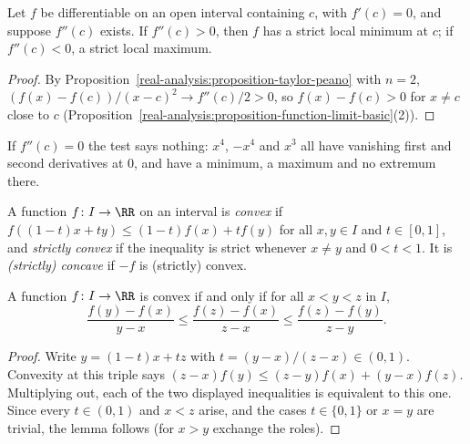\begin{corollary}\label{real-analysis:corollary-second-derivative-test}
Let $f$ be differentiable on an open interval containing $c$, with $f'(c) = 0$, and suppose $f''(c)$ exists. If $f''(c) > 0$, then $f$ has a strict local minimum at $c$; if $f''(c) < 0$, a strict local maximum.
\end{corollary}

\begin{proof}
By Proposition~\ref{real-analysis:proposition-taylor-peano} with $n = 2$, $(f(x) - f(c))/(x - c)^2 \to f''(c)/2 > 0$, so $f(x) - f(c) > 0$ for $x \neq c$ close to $c$ (Proposition~\ref{real-analysis:proposition-function-limit-basic}(2)).
\end{proof}

\begin{counterexample}\label{real-analysis:counterexample-second-derivative}
If $f''(c) = 0$ the test says nothing: $x^4$, $-x^4$ and $x^3$ all have vanishing first and second derivatives at $0$, and have a minimum, a maximum and no extremum there.
\end{counterexample}

\begin{definition}\label{real-analysis:definition-convex}
A function $f \colon I \to \RR$ on an interval is \emph{convex} if $f((1 - t)x + ty) \leq (1 - t)f(x) + tf(y)$ for all $x, y \in I$ and $t \in [0, 1]$, and \emph{strictly convex} if the inequality is strict whenever $x \neq y$ and
$0 < t < 1$. It is \emph{(strictly) concave} if $-f$ is (strictly) convex.
\end{definition}

\begin{lemma}\label{real-analysis:lemma-three-slopes}
A function $f \colon I \to \RR$ is convex if and only if for all $x < y < z$ in $I$,
\[
\frac{f(y) - f(x)}{y - x} \leq \frac{f(z) - f(x)}{z - x} \leq \frac{f(z) - f(y)}{z - y}.
\]
\end{lemma}

\begin{proof}
Write $y = (1 - t)x + tz$ with $t = (y - x)/(z - x) \in (0, 1)$. Convexity at this triple says $(z - x)f(y) \leq (z - y)f(x) + (y - x)f(z)$. Multiplying out, each of the two displayed inequalities is equivalent to
this one. Since every $t \in (0, 1)$ and $x < z$ arise, and the cases $t \in \{0, 1\}$ or $x = y$ are trivial, the lemma follows (for $x > y$ exchange the roles).
\end{proof}

